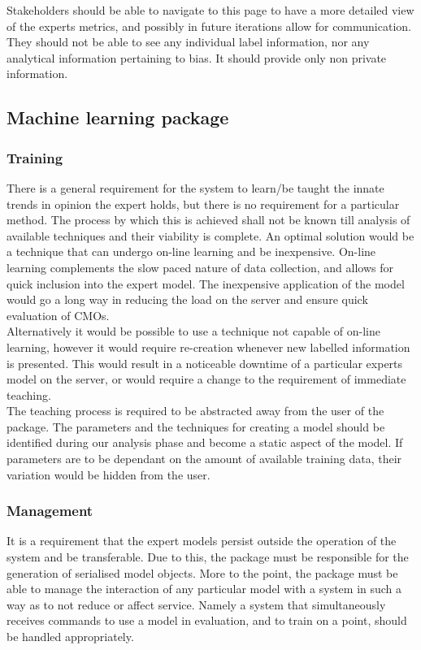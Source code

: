 \documentclass{ecmm427_assignment}
\begin{document}
\noindent Stakeholders should be able to navigate to this page to have a more detailed view of the experts metrics, and possibly in future iterations allow for communication. They should not be able to see any individual label information, nor any analytical information pertaining to bias. It should provide only non private information.

\subsection{Machine learning package}
\subsubsection{Training}

There is a general requirement for the system to learn/be taught the innate trends in opinion the expert holds, but there is no requirement for a particular method. The process by which this is achieved shall not be known till analysis of available techniques and their viability is complete. An optimal solution would be a technique that can undergo on-line learning and be inexpensive. On-line learning complements the slow paced nature of data collection, and allows for quick inclusion into the expert model. The inexpensive application of the model would go a long way in reducing the load on the server and ensure quick evaluation of CMOs.\\

\noindent Alternatively it would be possible to use a technique not capable of on-line learning, however it would require re-creation whenever new labelled information is presented. This would result in a noticeable downtime of a particular experts model on the server, or would require a change to the requirement of immediate teaching.\\

\noindent The teaching process is required to be abstracted away from the user of the package. The parameters and the techniques for creating a model should be identified during our analysis phase and become a static aspect of the model. If parameters are to be dependant on the amount of available training data, their variation would be hidden from the user.

\subsubsection{Management}

It is a requirement that the expert models persist outside the operation of the system and be transferable. Due to this, the package must be responsible for the generation of serialised model objects. More to the point, the package must be able to manage the interaction of any particular model with a system in such a way as to not reduce or affect service. Namely a system that simultaneously receives commands to use a model in evaluation, and to train on a point, should be handled appropriately.
\end{document}
